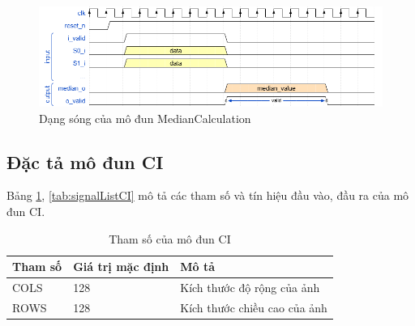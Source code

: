 \begin{figure}[!ht]
    \centering
    \includegraphics[width=\linewidth]{figures/medianCalculation.png}
    \caption{Dạng sóng của mô đun MedianCalculation}
    \label{fig:medianCalculation}
\end{figure}
\subsection{Đặc tả mô đun CI}
Bảng \ref{tab:paramListCI}, \ref{tab:signalListCI} mô tả các tham số và tín hiệu đầu vào, đầu ra của mô đun CI.

\begin{table}[!ht]
    \centering
    \renewcommand{\arraystretch}{1.3} %
    \begin{tabular}{|p{3cm} p{4cm} p{8cm}|}
        \hline
        \rowcolor{gray!30}
        \textbf{Tham số } & \textbf{Giá trị mặc định}  & \textbf{Mô tả} \\
        \hline
        COLS & 128 & Kích thước độ rộng của ảnh
        \\ \hline
        ROWS & 128 & Kích thước chiều cao của ảnh
        \\
        \hline
    \end{tabular}
    \caption{Tham số của mô đun CI}
    \label{tab:paramListCI}
\end{table}

